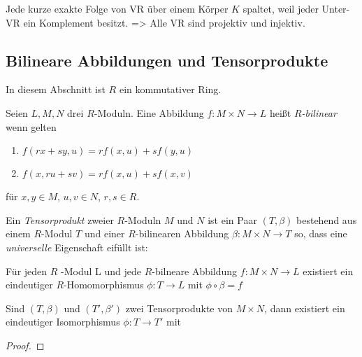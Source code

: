 \documentclass[../main.tex]{subfiles}
\begin{document}
\begin{remark}
    Jede kurze exakte Folge von VR über einem Körper $K$ spaltet, weil jeder Unter-VR ein Komplement besitzt.
    => Alle VR sind projektiv und injektiv.
\end{remark}

\subsection{Bilineare Abbildungen und Tensorprodukte}
In diesem Abschnitt ist $R$ ein kommutativer Ring.
\begin{definition}
    Seien $L,M,N$ drei $R$-Moduln.
    Eine Abbildung $f:M\times N\rightarrow L$ heißt \emph{$R$-bilinear} wenn gelten
    \begin{enumerate}
        \item $f(rx+sy,u) = rf(x,u)+sf(y,u)$
        \item $f(x,ru+sv) = rf(x,u) + sf(x,v)$
    \end{enumerate}
    für $x,y\in M$, $u,v \in N$, $r,s\in R$.
\end{definition}

\begin{definition}
    Ein \emph{Tensorprodukt} zweier $R$-Moduln $M$ und $N$ ist ein Paar $(T,\beta)$ bestehend aus einem $R$-Modul $T$ und einer $R$-bilinearen Abbildung $\beta:M\times N\rightarrow T$ so, dass eine \emph{universelle} Eigenschaft eifüllt ist:
    
    Für jeden $R$ -Modul L und jede $R$-bilneare Abbildung $f:M\times N\rightarrow L$ existiert ein eindeutiger $R$-Homomorphismus $\phi:T\rightarrow L$ mit $\phi\circ\beta = f$
    \TODO[Diagramm]
\end{definition}
\begin{lemma}
    Sind $(T,\beta)$ und $(T',\beta')$ zwei Tensorprodukte von $M\times N$, dann existiert ein eindeutiger Isomorphismus $\phi: T\rightarrow T'$ mit
    \TODO[Bild]
\end{lemma}
\begin{proof}
\end{proof}
\end{document}
